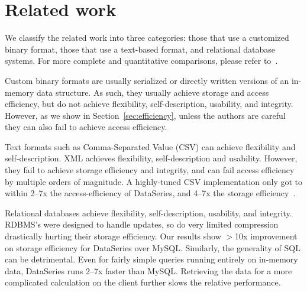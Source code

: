 \documentclass{acm_proc_article-sp}
\begin{document}
\section{Related work}\label{sec:related}

We classify the related work into three categories:
those that use a customized binary format, those that use a
text-based format, and relational database systems. 
For more complete and quantitative comparisons,
please refer to~\cite{DSTechnicalReportSnapshot}.

Custom binary formats are usually serialized or directly written
versions of an in-memory data structure.  As such, they usually
achieve storage 
and access efficiency, 
but do not achieve
flexibility, self-description, usability, and integrity.
However, as we
show in Section~\ref{sec:efficiency}, 
unless the authors are careful they can also
fail to achieve access efficiency.

Text formats such as Comma-Separated Value (CSV) can
achieve flexibility and self-description. XML achieves flexibility,
self-description and usability.  However, they fail
to achieve storage efficiency and integrity, and can fail access efficiency by
multiple orders of magnitude.  A highly-tuned CSV implementation
only got to within 2--7x the access-efficiency of DataSeries, and 4--7x
the storage efficiency~\cite{DSTechnicalReportSnapshot}.

Relational databases achieve flexibility, self-description,
usability, and integrity. RDBMS's were designed to handle updates, so
do very limited compression drastically hurting their storage
efficiency.  Our
results show $>$10x improvement on storage efficiency for DataSeries
over MySQL.
Similarly, the generality of SQL can be detrimental.  Even for fairly simple
queries running entirely on in-memory data, DataSeries runs 2--7x
faster than MySQL. 
Retrieving the data for a more complicated
calculation on the client further slows the relative performance.

\vspace{3pt}
\end{document}
